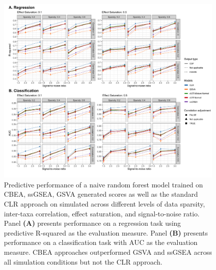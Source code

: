 \documentclass[10pt,letterpaper]{article}
\begin{document}
\begin{figure}[!h]
    \centering
    \includegraphics[width = \linewidth]{figures/sim_pred_combined.png}
    \caption{Predictive performance of a naive random forest model trained on CBEA, ssGSEA, GSVA generated scores as well as the standard CLR approach on simulated across different levels of data sparsity, inter-taxa correlation, effect saturation, and signal-to-noise ratio. Panel \textbf{(A)} presents performance on a regression task using predictive R-squared as the evaluation measure. Panel \textbf{(B)} presents performance on a classification task with AUC as the evaluation measure. CBEA approaches outperformed GSVA and ssGSEA across all simulation conditions but not the CLR approach.}
    \label{fig:6}
\end{figure}


\end{document}

